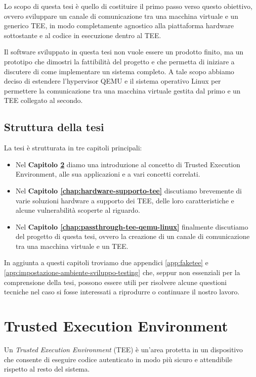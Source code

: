 \documentclass[12pt,italian]{report}
\begin{document}
\bigbreak \noindent

Lo scopo di questa tesi è quello di costituire il primo passo verso questo
obiettivo, ovvero sviluppare un canale di comunicazione tra una macchina
virtuale e un generico TEE, in modo completamente agnostico alla piattaforma
hardware sottostante e al codice in esecuzione dentro al TEE.

Il software sviluppato in questa tesi non vuole essere un prodotto finito,
ma un prototipo che dimostri la fattibilità del progetto e che permetta
di iniziare a discutere di come implementare un sistema completo.
A tale scopo abbiamo deciso di estendere l'hypervisor QEMU e il sistema
operativo Linux per permettere la comunicazione tra una macchina virtuale
gestita dal primo e un TEE collegato al secondo.

\section{Struttura della tesi}
\label{sec:struttura-tesi}
La tesi è strutturata in tre capitoli principali:
\begin{itemize}
    \item Nel \textbf{Capitolo \ref{chap:tee}} diamo una introduzione al
    concetto di Trusted Execution Environment, alle sua applicazioni
    e a vari concetti correlati.
    \item Nel \textbf{Capitolo \ref{chap:hardware-supporto-tee}} discutiamo
    brevemente di varie soluzioni hardware a supporto dei TEE, delle loro
    caratteristiche e alcune vulnerabilità scoperte al riguardo.
    \item Nel \textbf{Capitolo \ref{chap:passthrough-tee-qemu-linux}}
    finalmente discutiamo del progetto di questa tesi, ovvero la creazione
    di un canale di comunicazione tra una macchina virtuale e un TEE.
\end{itemize}

In aggiunta a questi capitoli troviamo due appendici \ref{app:faketee} e
\ref{app:impostazione-ambiente-sviluppo-testing} che, seppur non essenziali
per la comprensione della tesi,
possono essere utili per risolvere alcune questioni tecniche
nel caso si fosse interessati a riprodurre o continuare il nostro lavoro.

\chapter{Trusted Execution Environment}
\label{chap:tee}
Un \textit{Trusted Execution Environment} (TEE) è un'area protetta in un
dispositivo che consente di eseguire codice autenticato in modo
più sicuro e attendibile rispetto al resto del sistema.
\end{document}
